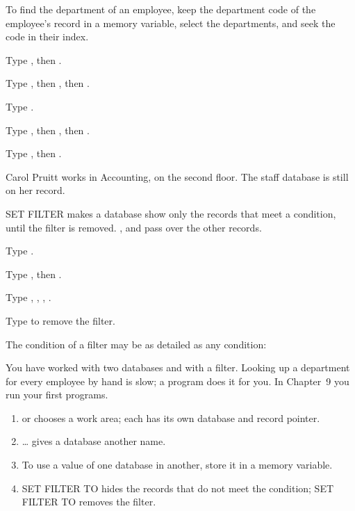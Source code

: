 To find the department of an employee, keep the department code of the
employee's record in a memory variable, select the departments, and seek the
code in their index.
\begin{Steps}[resume]
\item Type , then .
\item Type , then , then .
\item Type .
\item Type , then , then .
\item Type , then .
\end{Steps}
Carol Pruitt works in Accounting, on the second floor.  The staff database is
still on her record.

SET FILTER makes a database show only the records that meet a condition, until
the filter is removed.  ,  and  pass over the
other records.
\begin{Steps}[resume]
\item Type .
\item Type , then .
\item Type , , , .
\item Type  to remove the filter.
\end{Steps}
The condition of a filter may be as detailed as any  condition:

You have worked with two databases and with a filter.  Looking up a department
for every employee by hand is slow; a program does it for you.  In Chapter~9 you
run your first programs.

\begin{enumerate}
\item {}  or   chooses a work area; each
  has its own database and record pointer.
\item {} \ldots{}  gives a database another name.
\item To use a value of one database in another, store it in a memory variable.
\item SET FILTER TO  hides the records that do not meet the
  condition; SET FILTER TO removes the filter.
\end{enumerate}
